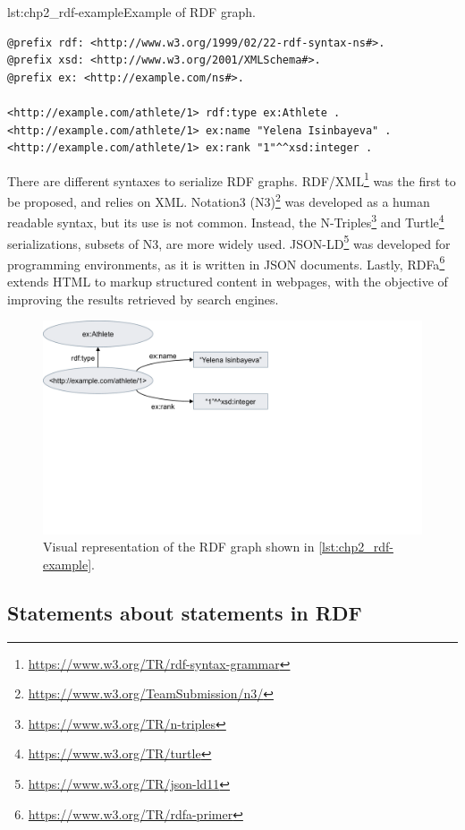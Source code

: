 \begin{minipage}{\textwidth}
\begin{captionedlisting}{lst:chp2_rdf-example}{Example of RDF graph.}
\centering
{\begin{lstlisting}[language=r2rml]
@prefix rdf: <http://www.w3.org/1999/02/22-rdf-syntax-ns#>.
@prefix xsd: <http://www.w3.org/2001/XMLSchema#>.
@prefix ex: <http://example.com/ns#>.

<http://example.com/athlete/1> rdf:type ex:Athlete .
<http://example.com/athlete/1> ex:name "Yelena Isinbayeva" .
<http://example.com/athlete/1> ex:rank "1"^^xsd:integer .
\end{lstlisting}}
\end{captionedlisting}
\end{minipage}

There are different syntaxes to serialize RDF graphs. RDF/XML\footnote{\url{https://www.w3.org/TR/rdf-syntax-grammar}} was the first to be proposed, and relies on XML. Notation3 (N3)\footnote{\url{https://www.w3.org/TeamSubmission/n3/}} was developed as a human readable syntax, but its use is not common. Instead, the N-Triples\footnote{\url{https://www.w3.org/TR/n-triples}} and Turtle\footnote{\url{https://www.w3.org/TR/turtle}} serializations, subsets of N3, are more widely used. JSON-LD\footnote{\url{https://www.w3.org/TR/json-ld11}} was developed for programming environments, as it is written in JSON documents. Lastly, RDFa\footnote{\url{https://www.w3.org/TR/rdfa-primer}} extends HTML to markup structured content in webpages, with the objective of improving the results retrieved by search engines. 



\begin{figure}[t]
\centering
\includegraphics[width=0.6\linewidth]{figures/chp2_rdf-example.pdf}
\caption[RDF graph example]{Visual representation of the RDF graph shown in \cref{lst:chp2_rdf-example}.}
\label{fig:chp2_rdf-example}
\end{figure}

\subsection{Statements about statements in RDF}
\label{sec:chp2_reifications}

